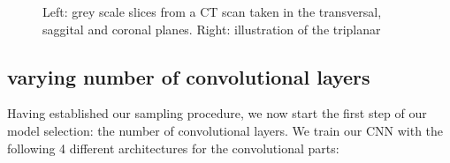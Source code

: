 \begin{figure}
\centering
\begin{minipage}{0.45\textwidth}
\centering
{}
\end{minipage}\hfill
\hspace{-1cm}
\begin{minipage}{0.45\textwidth}
\centering
{}
\end{minipage}
\caption{Left: grey scale slices from a CT scan taken in the transversal, saggital and coronal planes. Right: illustration of the triplanar}
\end{figure}

\subsection{varying number of convolutional layers}

Having established our sampling procedure, we now start the first step of our model selection: the number of convolutional layers. We train our CNN with the following 4 different architectures for the convolutional parts:

